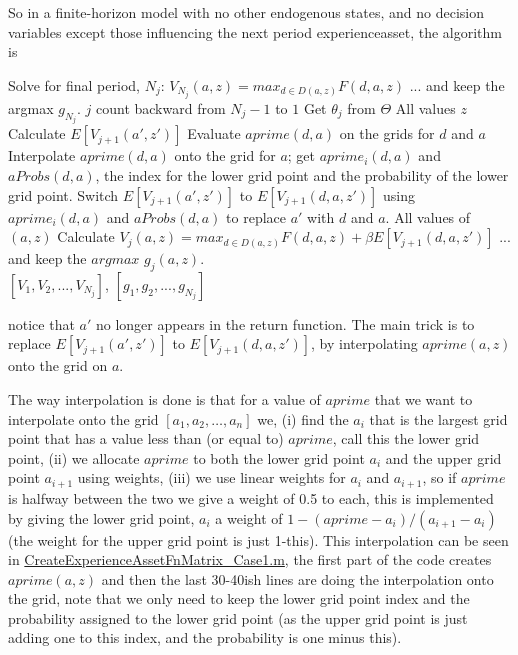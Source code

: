So in a finite-horizon model with no other endogenous states, and no decision variables except those influencing the next period experienceasset, the algorithm is
\begin{algorithmic}
 \State Solve for final period, $N_j$: $V_{N_j}(a,z)=max_{d\in D(a,z)} F(d,a,z)$
 \State ... and keep the argmax $g_{N_j}$.
 \For $j$ count backward from $N_j-1$ to $1$
   \State Get $\theta_j$ from $\Theta$
   \For All values $z$
    \State Calculate $E[V_{j+1}(a',z')]$
    \State Evaluate $aprime(d,a)$ on the grids for $d$ and $a$
    \State Interpolate $aprime(d,a)$ onto the grid for $a$; get $aprime_i(d,a)$ and $aProbs(d,a)$, the index for the lower grid point and the probability of the lower grid point.
    \State Switch $E[V_{j+1}(a',z')]$ to $E[V_{j+1}(d,a,z')]$ using $aprime_i(d,a)$ and $aProbs(d,a)$ to replace $a'$ with $d$ and $a$.
    \For All values of $(a,z)$
     \State Calculate $V_j(a,z)=max_{d \in D(a,z)} F(d,a,z)+\beta E[V_{j+1}(d,a,z')]$
     \State ... and keep the $argmax$ $g_j(a,z)$.
     \EndFor
   \EndFor
  \EndFor
   \\ \Return $[V_1,V_2,...,V_{N_j}]$, $[g_1,g_2,...,g_{N_j}]$
\end{algorithmic}
notice that $a'$ no longer appears in the return function. The main trick is to replace $E[V_{j+1}(a',z')]$ to $E[V_{j+1}(d,a,z')]$, by interpolating $aprime(a,z)$ onto the grid on $a$.

The way interpolation is done is that for a value of $aprime$ that we want to interpolate onto the grid $[a_1,a_2,\dots,a_n]$ we, (i) find the $a_i$ that is the largest grid point that has a value less than (or equal to) $aprime$, call this the lower grid point, (ii) we allocate $aprime$ to both the lower grid point $a_i$ and the upper grid point $a_{i+1}$ using weights, (iii) we use linear weights for $a_i$ and $a_{i+1}$, so if $aprime$ is halfway between the two we give a weight of 0.5 to each, this is implemented by giving the lower grid point, $a_i$ a weight of $1-(aprime-a_i)/(a_{i+1}-a_i)$ (the weight for the upper grid point is just 1-this). This interpolation can be seen in \href{https://github.com/vfitoolkit/VFIToolkit-matlab/blob/master/aprimeFnMatrix/CreateExperienceAssetFnMatrix_Case1.m}{CreateExperienceAssetFnMatrix\_{}Case1.m}, the first part of the code creates $aprime(a,z)$ and then the last 30-40ish lines are doing the interpolation onto the grid, note that we only need to keep the lower grid point index and the probability assigned to the lower grid point (as the upper grid point is just adding one to this index, and the probability is one minus this).

